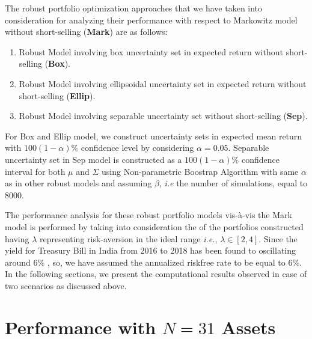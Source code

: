 The robust portfolio optimization approaches that we have taken into consideration for analyzing their performance with respect to Markowitz model without short-selling (\textbf{Mark}) are as follows:
\begin{enumerate}
    \item{Robust Model involving box uncertainty set in expected return without short-selling (\textbf{Box}).}
    \item{Robust Model involving ellipsoidal uncertainty set in expected return without short-selling (\textbf{Ellip}).}
    \item{Robust Model involving separable uncertainty set without short-selling (\textbf{Sep}).}
\end{enumerate}
For Box and Ellip model, we construct uncertainty sets in expected mean return with $100(1-\alpha)\%$ confidence level by considering $\alpha=0.05$. Separable uncertainty set in Sep model is constructed as a $100(1-\alpha)\%$ confidence interval for both $\mu$ and $\Sigma$ using Non-parametric Boostrap Algorithm with same $\alpha$ as in other robust models and assuming $\beta$, \textit{i.e} the number of simulations, equal to 8000.

The performance analysis for these robust portfolio models vis-\`a-vis the Mark model is performed by taking into consideration the  of the portfolios constructed having $\lambda$ representing risk-aversion in the ideal range \cite{fabozzi} \textit{i.e.}, $\lambda \in [2,4]$. Since the yield for Treasury Bill in India from 2016 to 2018 has been found to oscillating around $6\%$ \cite{rbi}, so, we have assumed the annualized riskfree rate to be equal to $6\%$. In the following sections, we present the computational results observed in case of two scenarios as discussed above.

\section{Performance with $N=31$ Assets}

